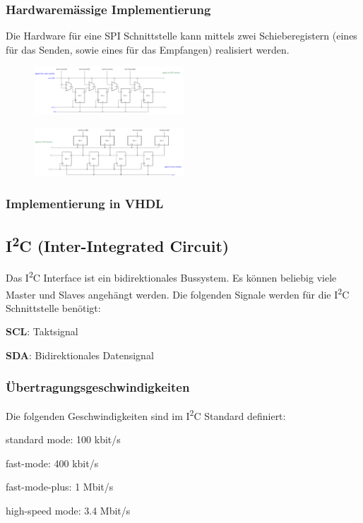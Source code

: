 \subsubsection{Hardwaremässige Implementierung}
Die Hardware für eine SPI Schnittstelle kann mittels zwei Schieberegistern (eines für das Senden, sowie eines für das Empfangen) realisiert werden.
\begin{multicols}{2}
    \begin{figure}[H]
        \includegraphics[width=0.5\textwidth]{images/spi_shift1.png}
    \end{figure}
    \begin{figure}[H]
        \includegraphics[width=0.5\textwidth]{images/spi_shift2.png}
    \end{figure}
\end{multicols}

\subsubsection{Implementierung in VHDL}


\subsection{I\textsuperscript{2}C (Inter-Integrated Circuit)}
Das I\textsuperscript{2}C Interface ist ein bidirektionales Bussystem. Es können beliebig viele Master und Slaves angehängt werden. Die folgenden Signale werden für die I\textsuperscript{2}C Schnittstelle benötigt:
\begin{compactitem}
    \item \textbf{SCL}: Taktsignal
    \item \textbf{SDA}: Bidirektionales Datensignal
\end{compactitem}

\subsubsection{Übertragungsgeschwindigkeiten}
Die folgenden Geschwindigkeiten sind im I\textsuperscript{2}C Standard definiert:
\begin{compactitem}
    \item standard mode: 100 kbit/s
    \item fast-mode: 400 kbit/s
    \item fast-mode-plus: 1 Mbit/s
    \item high-speed mode: 3.4 Mbit/s
\end{compactitem}

